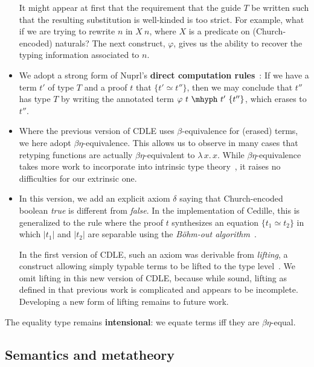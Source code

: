 \documentclass{article}
\newcommand{\absu}[3]{{#1}\, #2.\, #3}
\begin{document}
\begin{itemize}
  It might appear at first that the requirement that the guide \(T\) be written
  such that the resulting substitution is well-kinded is too strict.
  For example, what if we are trying to rewrite \(n\) in \(X\ n\), where \(X\)
  is a predicate on (Church-encoded) naturals?
  The next construct, \(\varphi\), gives us the ability to recover the typing
  information associated to \(n\).
\item We adopt a strong form of Nuprl's \textbf{direct computation rules}~\cite{constable+86}:
  If we have a term $t'$ of type $T$ and a proof $t$ that $\{ t' \simeq t''\}$, then we may conclude that
  $t''$ has type $T$ by writing the annotated term $\varphi\ t\ \mhyph\ t'\ \{t''\}$, which
  erases to $t''$.
\item Where the previous version of CDLE uses $\beta$-equivalence for (erased) terms, we here adopt $\beta\eta$-equivalence.  This
  allows us to observe in many cases that retyping functions are actually $\beta\eta$-equivalent to $\absu{\lambda}{x}{x}$.
  While $\beta\eta$-equivalence takes more work to incorporate into intrinsic 
  type theory~\cite{geuvers92},
  it raises no difficulties for our extrinsic one.
\item In this version, we add an explicit axiom $\delta$ saying that Church-encoded boolean \emph{true} is different from
  \emph{false}.
  In the implementation of Cedille, this is generalized to the rule where the
  proof \(t\) synthesizes an equation \(\{t_1 \simeq t_2\}\) in which \(|t_1|\)
  and \(|t_2|\) are separable using the \emph{B\"ohm-out algorithm}~\cite{BDPR79_Bohm-Algorithm}.

  In the first version of CDLE, such an axiom was derivable from \emph{lifting}, a construct allowing
  simply typable terms to be lifted to the type level~\cite{stump17}.  We omit lifting in this new version of CDLE, because while
  sound, lifting as defined in that previous work is complicated and appears to be incomplete.  Developing a new
  form of lifting remains to future work.
\end{itemize}

The equality type remains \textbf{intensional}: we equate terms iff they are $\beta\eta$-equal.  

\subsection{Semantics and metatheory}
\end{document}
